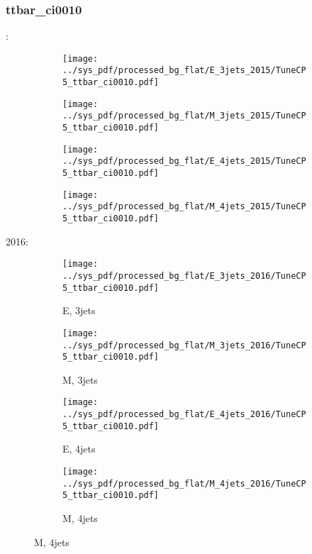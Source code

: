 \documentclass{beamer}
\begin{document}
\begin{frame}
\frametitle{ttbar_ci0010}
\fontsize{5}{1}:
\begin{figure}
\centering
\begin{subfigure}[b]{0.24\textwidth}
\texttt{[image: ../sys\_pdf/processed\_bg\_flat/E\_3jets\_2015/TuneCP5\_ttbar\_ci0010.pdf]}
\end{subfigure}
\begin{subfigure}[b]{0.24\textwidth}
\texttt{[image: ../sys\_pdf/processed\_bg\_flat/M\_3jets\_2015/TuneCP5\_ttbar\_ci0010.pdf]}
\end{subfigure}
\begin{subfigure}[b]{0.24\textwidth}
\texttt{[image: ../sys\_pdf/processed\_bg\_flat/E\_4jets\_2015/TuneCP5\_ttbar\_ci0010.pdf]}
\end{subfigure}
\begin{subfigure}[b]{0.24\textwidth}
\texttt{[image: ../sys\_pdf/processed\_bg\_flat/M\_4jets\_2015/TuneCP5\_ttbar\_ci0010.pdf]}
\end{subfigure}
\end{figure}
2016:
\begin{figure}
\centering
\begin{subfigure}[b]{0.24\textwidth}
\texttt{[image: ../sys\_pdf/processed\_bg\_flat/E\_3jets\_2016/TuneCP5\_ttbar\_ci0010.pdf]}
\captionsetup{font=tiny}
\caption{E, 3jets}
\end{subfigure}
\begin{subfigure}[b]{0.24\textwidth}
\texttt{[image: ../sys\_pdf/processed\_bg\_flat/M\_3jets\_2016/TuneCP5\_ttbar\_ci0010.pdf]}
\captionsetup{font=tiny}
\caption{M, 3jets}
\end{subfigure}
\begin{subfigure}[b]{0.24\textwidth}
\texttt{[image: ../sys\_pdf/processed\_bg\_flat/E\_4jets\_2016/TuneCP5\_ttbar\_ci0010.pdf]}
\captionsetup{font=tiny}
\caption{E, 4jets}
\end{subfigure}
\begin{subfigure}[b]{0.24\textwidth}
\texttt{[image: ../sys\_pdf/processed\_bg\_flat/M\_4jets\_2016/TuneCP5\_ttbar\_ci0010.pdf]}
\captionsetup{font=tiny}
\caption{M, 4jets}
\end{subfigure}
\end{figure}
\end{frame}
\end{document}
